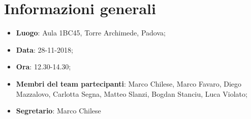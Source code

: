 \section{Informazioni generali}
\begin{itemize}
	\item \textbf{Luogo}: Aula 1BC45, Torre Archimede, Padova;
	\item \textbf{Data}: 28-11-2018;
	\item \textbf{Ora}:	12.30-14.30;
	\item \textbf{Membri del team partecipanti}: Marco Chilese, Marco Favaro, Diego Mazzalovo, Carlotta Segna, Matteo Slanzi, Bogdan Stanciu, Luca Violato;
	\item \textbf{Segretario}: Marco Chilese
\end{itemize}